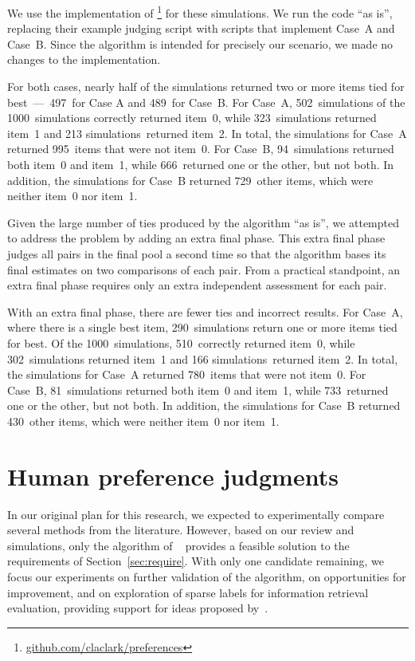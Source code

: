 We use the implementation of \citet{cvs21}\footnote{\url{github.com/claclark/preferences}} for these simulations. We run the code ``as is'', replacing their example judging script with scripts that implement Case~A and Case~B. Since the algorithm is intended for precisely our scenario, we made no changes to the implementation.

For both cases, nearly half of the simulations returned two or more items tied for best~---~497~for Case A and 489~for Case~B. For Case~A, 502~simulations of the 1000~simulations correctly returned item~0, while 323~simulations returned item~1 and 213 simulations~returned item~2. In total, the simulations for Case~A returned 995~items that were not item~0. For Case~B, 94~simulations returned both item~0 and item~1, while 666~returned one or the other, but not both. In addition, the simulations for Case~B returned 729~other items, which were neither item~0 nor item~1.

Given the large number of ties produced by the algorithm ``as is'', we attempted to address the problem by adding an extra final phase. This extra final phase judges all pairs in the final pool a second time so that the algorithm bases its final estimates on two comparisons of each pair. From a practical standpoint, an extra final phase requires only an extra independent assessment for each pair.

With an extra final phase, there are fewer ties and incorrect results. For Case~A, where there is a single best item, 290~simulations return one or more items tied for best. Of the 1000~simulations, 510~correctly returned item~0, while 302~simulations returned item~1 and 166 simulations~returned item~2. In total, the simulations for Case~A returned 780~items that were not item~0. For Case~B, 81~simulations returned both item~0 and item~1, while 733~returned one or the other, but not both. In addition, the simulations for Case~B returned 430~other items, which were neither item~0 nor item~1. 

\section{Human preference judgments}
\label{sec:human}

In our original plan for this research, we expected to experimentally compare several methods from the literature. However, based on our review and simulations, only the algorithm of ~\citet{cvs21} provides a feasible solution to the requirements of Section~\ref{sec:require}. With only one candidate remaining, we focus our experiments on further validation of the algorithm, on opportunities for improvement, and on exploration of sparse labels for information retrieval evaluation, providing support for ideas proposed by~\citet{avyc21}.


